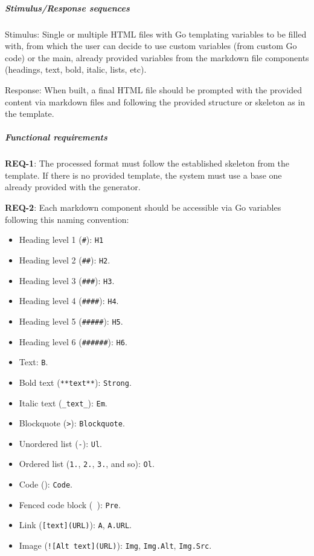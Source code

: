 \subparagraph{Stimulus/Response
sequences}\label{subpar:stimulusresponse-sequences-2}

Stimulus: Single or multiple HTML files with Go templating variables to
be filled with, from which the user can decide to use custom variables
(from custom Go code) or the main, already provided variables from the
markdown file components (headings, text, bold, italic, lists, etc).

Response: When built, a final HTML file should be prompted with the
provided content via markdown files and following the provided structure
or skeleton as in the template.

\subparagraph{Functional requirements}\label{subpar:functional-requirements-1}

\textbf{REQ-1}: The processed format must follow the established
skeleton from the template. If there is no provided template, the system
must use a base one already provided with the generator.

\textbf{REQ-2}: Each markdown component should be accessible via Go
variables following this naming convention:

\begin{itemize}
    \item
    Heading level 1 (\texttt{\#}): \texttt{H1}
    \item
    Heading level 2 (\texttt{\#\#}): \texttt{H2}.
    \item
    Heading level 3 (\texttt{\#\#\#}): \texttt{H3}.
    \item
    Heading level 4 (\texttt{\#\#\#\#}): \texttt{H4}.
    \item
    Heading level 5 (\texttt{\#\#\#\#\#}): \texttt{H5}.
    \item
    Heading level 6 (\texttt{\#\#\#\#\#\#}): \texttt{H6}.
    \item
    Text: \texttt{B}.
    \item
    Bold text (\texttt{**text**}): \texttt{Strong}.
    \item
    Italic text (\texttt{\_text\_}): \texttt{Em}.
    \item
    Blockquote (\texttt{\textgreater{}}): \texttt{Blockquote}.
    \item
    Unordered list (\texttt{-}): \texttt{Ul}.
    \item
    Ordered list (\texttt{1.}, \texttt{2.}, \texttt{3.}, and so):
    \texttt{Ol}.
    \item
    Code (\texttt{\textasciigrave{}\textasciigrave{}}): \texttt{Code}.
    \item
    Fenced code block
    (\texttt{\textasciigrave{}\textasciigrave{}\textasciigrave{}\ \textasciigrave{}\textasciigrave{}\textasciigrave{}}):
    \texttt{Pre}.
    \item
    Link (\texttt{{[}text{]}(URL)}): \texttt{A}, \texttt{A.URL}.
    \item
    Image (\texttt{!{[}Alt\ text{]}(URL)}): \texttt{Img},
    \texttt{Img.Alt}, \texttt{Img.Src}.
\end{itemize}


